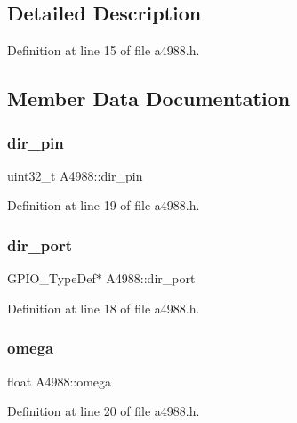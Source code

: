 \subsection{Detailed Description}


Definition at line 15 of file a4988.\+h.



\subsection{Member Data Documentation}
\mbox{\label{struct_a4988_a2871ee75d253c10e1e35bd600b9039db}} 
\subsubsection{\texorpdfstring{dir\_pin}{dir\_pin}}
{\footnotesize\ttfamily uint32\+\_\+t A4988\+::dir\+\_\+pin}



Definition at line 19 of file a4988.\+h.

\mbox{\label{struct_a4988_af006546fbff4560a0f37f5b4c01dee69}} 
\subsubsection{\texorpdfstring{dir\_port}{dir\_port}}
{\footnotesize\ttfamily G\+P\+I\+O\+\_\+\+Type\+Def$\ast$ A4988\+::dir\+\_\+port}



Definition at line 18 of file a4988.\+h.

\mbox{\label{struct_a4988_a8ea23ea2cf8e5f0b76f0b9f9e2ed1341}} 
\subsubsection{\texorpdfstring{omega}{omega}}
{\footnotesize\ttfamily float A4988\+::omega}



Definition at line 20 of file a4988.\+h.

\mbox{\label{struct_a4988_ada56cbe62748a6dc76d5386f1dde90e8}} 
